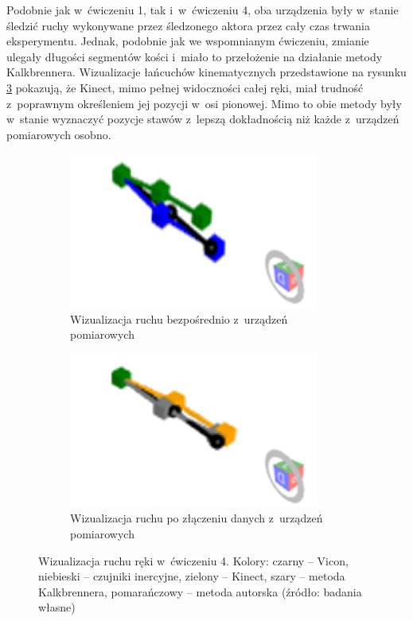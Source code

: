 Podobnie jak w~ćwiczeniu 1, tak i~w~ćwiczeniu 4, oba urządzenia były w~stanie śledzić ruchy wykonywane przez śledzonego aktora przez cały czas trwania eksperymentu. Jednak, podobnie jak we wspomnianym ćwiczeniu, zmianie ulegały długości segmentów kości i~miało to przełożenie na działanie metody Kalkbrennera. Wizualizacje łańcuchów kinematycznych przedstawione na rysunku \ref{fig:experiments:four} pokazują, że Kinect, mimo pełnej widoczności całej ręki, miał trudność z~poprawnym określeniem jej pozycji w~osi pionowej. Mimo to obie metody były w~stanie wyznaczyć pozycje stawów z~lepszą dokładnością niż każde z~urządzeń pomiarowych osobno.

\begin{figure}[!htb]
	\captionsetup{singlelinecheck=off}
	\centering
	\begin{subfigure}[b]{0.48\textwidth}
		\centering
		\includegraphics[width=0.9\textwidth]{images/400/raw.png}	
		\caption{Wizualizacja ruchu bezpośrednio z~urządzeń pomiarowych}
		\label{fig:experiments:four:raw}
	\end{subfigure}
	\hfill																																											
	\begin{subfigure}[b]{0.48\textwidth}
		\centering
		\includegraphics[width=0.9\textwidth]{images/400/Fused.png}		
		\caption{Wizualizacja ruchu po złączeniu danych z~urządzeń pomiarowych}
		\label{fig:experiments:four:fused}	
	\end{subfigure}
																																													
	\caption[Wizualizacja ruchu ręki w~ćwiczeniu 4]{Wizualizacja ruchu ręki w~ćwiczeniu 4.  Kolory: czarny -- Vicon, niebieski -- czujniki inercyjne, zielony -- Kinect, szary -- metoda Kalkbrennera, pomarańczowy -- metoda autorska (źródło: badania własne)}	
	\label{fig:experiments:four}
\end{figure}

